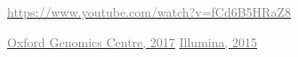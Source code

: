 \documentclass[x11names, svgnames]{beamer}
\begin{document}
\begin{frame}
\begin{columns}[T]
\begin{column}{0.5\textwidth}
\begin{center}
      \end{center}
      \begin{center}
        \tiny{\href{https://www.youtube.com/watch?v=fCd6B5HRaZ8}{\textcolor{gray}{https://www.youtube.com/watch?v=fCd6B5HRaZ8}}}
      \end{center}
      \vspace{4em}
      \footnotesize{
        \hfill\href{https://www.well.ox.ac.uk/ogc/sequencing-quality-monitoring-run/}{\textcolor{gray}{Oxford Genomics Centre, 2017}}
      }
      \vspace{6em}
      \footnotesize{
        \hfill\href{https://emea.illumina.com/content/dam/illumina-marketing/documents/products/other/ivf-reproductive-genetic-health-ngs-primer-1570-2015-012.pdf}{\textcolor{gray}{Illumina, 2015}}
      }
    \end{column}
  \end{columns}
\end{frame}
\end{document}

